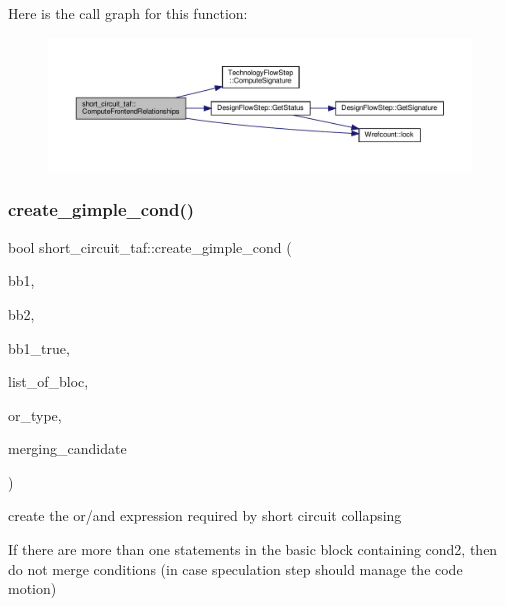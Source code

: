 Here is the call graph for this function\+:
\nopagebreak
\begin{figure}[H]
\begin{center}
\leavevmode
\includegraphics[width=350pt]{dd/d1c/classshort__circuit__taf_aa20b443f2eb7bdefea17819fc62b2ce0_cgraph}
\end{center}
\end{figure}
\mbox{\label{classshort__circuit__taf_ae72320e3a6c9112a5d7fe80414294d46}} 
\subsubsection{\texorpdfstring{create\+\_\+gimple\+\_\+cond()}{create\_gimple\_cond()}}
{\footnotesize\ttfamily bool short\+\_\+circuit\+\_\+taf\+::create\+\_\+gimple\+\_\+cond (\begin{DoxyParamCaption}\item[{unsigned int}]{bb1,  }\item[{unsigned int}]{bb2,  }\item[{bool}]{bb1\+\_\+true,  }\item[{std\+::map$<$ unsigned int, bloc\+Ref $>$ \&}]{list\+\_\+of\+\_\+bloc,  }\item[{bool}]{or\+\_\+type,  }\item[{unsigned int}]{merging\+\_\+candidate }\end{DoxyParamCaption})\hspace{0.3cm}{\ttfamily [private]}}



create the or/and expression required by short circuit collapsing 

If there are more than one statements in the basic block containing cond2, then do not merge conditions (in case speculation step should manage the code motion)

